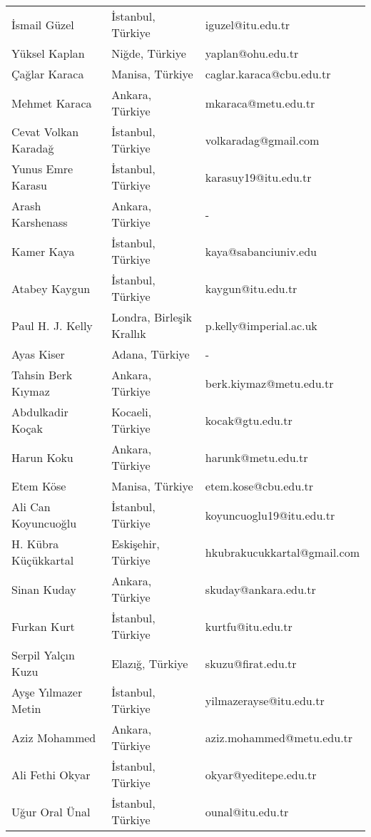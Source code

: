 {\begin{longtable}[c]{@{}lll@{}}
İsmail Güzel & İstanbul, Türkiye & iguzel@itu.edu.tr \\
Yüksel Kaplan & Niğde, Türkiye & yaplan@ohu.edu.tr \\
\rowcolor[HTML]{C0C0C0} 
Çağlar Karaca & Manisa, Türkiye & caglar.karaca@cbu.edu.tr \\
Mehmet Karaca & Ankara, Türkiye & mkaraca@metu.edu.tr \\
\rowcolor[HTML]{C0C0C0} 
Cevat Volkan Karadağ & İstanbul, Türkiye & volkaradag@gmail.com \\
Yunus Emre Karasu & İstanbul, Türkiye & karasuy19@itu.edu.tr \\
\rowcolor[HTML]{C0C0C0} 
Arash Karshenass & Ankara, Türkiye & - \\
Kamer Kaya & İstanbul, Türkiye & kaya@sabanciuniv.edu \\
\rowcolor[HTML]{C0C0C0} 
Atabey Kaygun & İstanbul, Türkiye & kaygun@itu.edu.tr \\
Paul H. J. Kelly & Londra, Birleşik Krallık & p.kelly@imperial.ac.uk \\
\rowcolor[HTML]{C0C0C0} 
Ayas Kiser & Adana, Türkiye & - \\
Tahsin Berk Kıymaz & Ankara, Türkiye & berk.kiymaz@metu.edu.tr \\
\rowcolor[HTML]{C0C0C0} 
Abdulkadir Koçak & Kocaeli, Türkiye & kocak@gtu.edu.tr \\
Harun Koku & Ankara, Türkiye & harunk@metu.edu.tr \\
\rowcolor[HTML]{C0C0C0} 
Etem Köse & Manisa, Türkiye & etem.kose@cbu.edu.tr \\
Ali Can Koyuncuoğlu & İstanbul, Türkiye & koyuncuoglu19@itu.edu.tr \\
\rowcolor[HTML]{C0C0C0} 
H. Kübra Küçükkartal & Eskişehir, Türkiye & hkubrakucukkartal@gmail.com \\
Sinan Kuday & Ankara, Türkiye & skuday@ankara.edu.tr \\
\rowcolor[HTML]{C0C0C0} 
Furkan Kurt & İstanbul, Türkiye & kurtfu@itu.edu.tr \\
Serpil Yalçın Kuzu & Elazığ, Türkiye & skuzu@firat.edu.tr \\
\rowcolor[HTML]{C0C0C0} 
Ayşe Yılmazer Metin & İstanbul, Türkiye & yilmazerayse@itu.edu.tr \\
Aziz Mohammed & Ankara, Türkiye & aziz.mohammed@metu.edu.tr \\
\rowcolor[HTML]{C0C0C0} 
Ali Fethi Okyar & İstanbul, Türkiye & okyar@yeditepe.edu.tr \\
Uğur Oral Ünal & İstanbul, Türkiye & ounal@itu.edu.tr \\

\end{longtable}}
